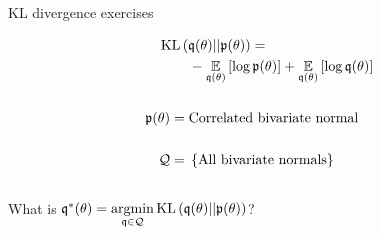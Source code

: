 
\newcommand{\TikzPtheta}[2]{
\draw[#1] (4.5, 3)  node[anchor=north] {#2};
\begin{scope}[shift={(2.5,2.5)}]
    \begin{scope}[rotate=45]
        \begin{scope}[shift={(-2.5,-2.5)}]
            \foreach \s in {0.2, 0.4, 0.6, 0.8, 1.0}
            \draw[#1] (2.5,2.5) ellipse (\s * 3 and \s * 1);
        \end{scope}
    \end{scope}
\end{scope}
}


\newcommand{\TikzPlotArea}{
\draw (0,0)--(5,0);
\foreach \x in {0,...,5}
  \draw (\x,0)--(\x,-.1) node[anchor=north]{};

\draw (0,0)--(0,5);
\foreach \y in {0,...,5}
  \draw (0,\y)--(-.1,\y) node[anchor=east] {};

\draw (0,5) node[anchor=east] {$\theta_2$};
\draw (5,0) node[anchor=north] {$\theta_1$};
}



\begin{frame}{KL divergence exercises}
\begin{minipage}{0.5\textwidth}
%
\begin{align*}
%
\MoveEqLeft
\kl{\q(\theta)}{\p(\theta)} ={}\\&
-\expect{\q(\theta)}{\log \p(\theta)} +
\expect{\q(\theta)}{\log \q(\theta)}\\ \\
\p(\theta) ={}& \textrm{Correlated bivariate normal}\\ \\
%
\qdom ={}& \left\{ \textrm{All bivariate normals}\right\}\\ \\
%
\end{align*}
%
What is
$\mathfrak{q}^*(\theta) = \underset{\mathfrak{q} \in \mathcal{Q}}{\mathrm{argmin}}\, \mathrm{KL}\left(\mathfrak{q}(\theta) || \mathfrak{p}(\theta) \right)$?
%
\end{minipage}
%
\begin{minipage}{0.4\textwidth}

\end{minipage}


\end{frame}


